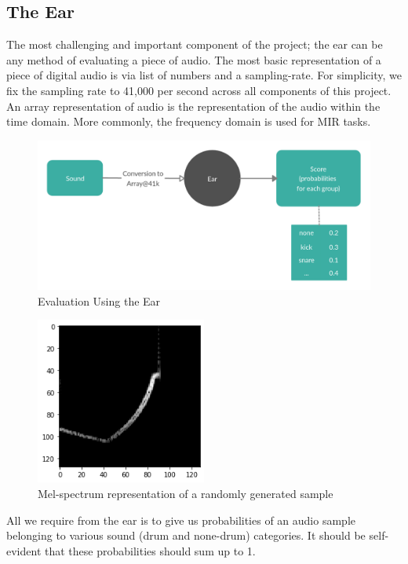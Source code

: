 \documentclass{article}
\begin{document}
\subsection{The Ear}
The most challenging and important component of the project; the ear can be any method of evaluating a piece of audio. The most basic representation of a piece of digital audio is via list of numbers and a sampling-rate. For simplicity, we fix the sampling rate to 41,000 per second across all components of this project. An array representation of audio is the representation of the audio within the time domain. More commonly, the frequency domain is used for MIR tasks.
\begin{figure}[H]
\centering
\includegraphics[width=\textwidth]{images/SSS_ear.png}
\caption{Evaluation Using the Ear}
\label{fig:SSS generator}
\end{figure}

\begin{figure}[h!]
\centering
\includegraphics[width=0.5\textwidth]{images/specplot.png}
\caption{Mel-spectrum representation of a randomly generated sample}
\label{fig:SSS generator}
\end{figure}
All we require from the ear is to give us probabilities of an audio sample belonging to various sound (drum and none-drum) categories. It should be self-evident that these probabilities should sum up to 1.\\
\end{document}

